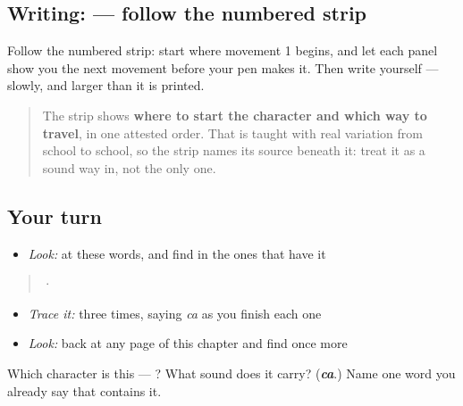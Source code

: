\subsection*{Writing:  — follow the numbered strip}

Follow the numbered strip: start where movement 1 begins, and let each panel show you the next movement before your pen makes it. Then write  yourself — slowly, and larger than it is printed.

\begin{quote}
The strip shows \textbf{where to start the character and which way to travel}, in one attested order. That is taught with real variation from school to school, so the strip names its source beneath it: treat it as a sound way in, not the only one.
\end{quote}

\subsection*{Your turn}
\begin{itemize}
\raggedright
  \item \emph{Look:} at these words, and find  in the ones that have it
\end{itemize}

\begin{quote}
  ·  
\end{quote}

\begin{itemize}
\raggedright
  \item \emph{Trace it:}  three times, saying \emph{ca} as you finish each one
  \item \emph{Look:} back at any page of this chapter and find  once more
\end{itemize}

\begin{tcolorbox}[breakable,colback=teal!4,colframe=teal!35!black,title={Before you move on}]
Which character is this — ? What sound does it carry? (\emph{\textbf{ca}}.) Name one word you already say that contains it.
\end{tcolorbox}
